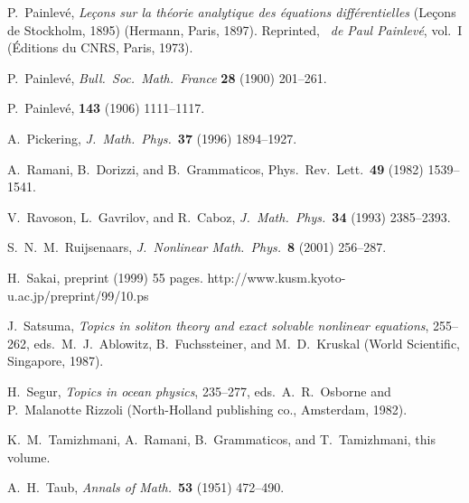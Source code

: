\documentclass[10pt]{article}
\begin{document}
\begin{thebibliography}{99}
 P.~Painlev\'e,
{\it Le\c{c}ons sur la th\'eorie analytique des \'equations diff\'erentielles}
(Le\c{c}ons de Stockholm, 1895)
(Hermann, Paris, 1897).
Reprinted, {\it \Oeuvres\ de Paul Painlev\'e}, vol.~I
(\'Editions du CNRS, Paris, 1973).

 P.~Painlev\'e,
{\it Bull.~Soc.~Math.~France} {\bf 28} (1900) 201--261.
 
 P.~Painlev\'e,
{\it \CRAS} {\bf 143} (1906) 1111--1117.

 A.~Pickering,
{\it J.~Math.~Phys.}~{\bf 37} (1996) 1894--1927.

 A.~Ramani, B.~Dorizzi, and B.~Grammaticos, 
Phys.~Rev.~Lett.~{\bf 49} (1982) 1539--1541.

 V.~Ravoson, L.~Gavrilov, and R.~Caboz,
{\it J.~Math.~Phys.}~{\bf 34} (1993) 2385--2393.

  S.~N.~M.~Ruijsenaars,    
{\it J.~Nonlinear Math.~Phys.}~{\bf 8} (2001) 256--287.

 H.~Sakai,
preprint (1999) 55 pages.
  http://www.kusm.kyoto-u.ac.jp/preprint/99/10.ps

 J.~Satsuma,
{\it Topics in soliton theory and exact solvable nonlinear equations},
255--262,
eds.~M.~J.~Ablowitz, B.~Fuchssteiner, and M.~D.~Kruskal
(World Scientific, Singapore, 1987).

 H.~Segur, 
{\it Topics in ocean physics},
235--277,
eds.~A.~R.~Osborne and P.~Malanotte Rizzoli
(North-Holland publishing co., Amsterdam, 1982).

K.~M.~Tamizhmani, A.~Ramani, B.~Grammaticos, and T.~Tamizhmani,
this volume.

 A.~H.~Taub,
{\it Annals of Math.}~{\bf 53} (1951) 472--490.


\end{thebibliography}
\end{document}
